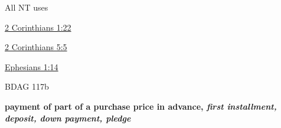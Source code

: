 				\begin{compactdesc}
					\item[All NT uses] \textbf{} %
						\begin{compactdesc}
							\item[{\hyperref[2CORINTHIANS-1-22]{2 Corinthians 1:22}}]
							\item[{\hyperref[2CORINTHIANS-5-5]{2 Corinthians 5:5}}]
							\item[{\hyperref[EPHESIANS-1-14]{Ephesians 1:14}}]
						\end{compactdesc}
				\end{compactdesc}
			
				\begin{compactdesc}
				
					\item[BDAG 117b] \phantom{.}
						\begin{compactitem}
							\item \textbf{payment of part of a purchase price in advance, \textit{first installment, deposit, down payment, pledge}}
						\end{compactitem}
						
						
						
						

\end{compactdesc}
